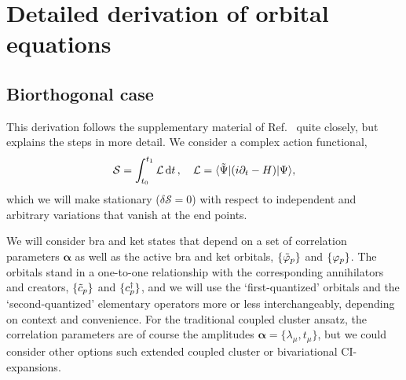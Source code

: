 \documentclass[aip,jcp,preprint,superscriptaddress,nofootinbib]{revtex4-1}
\begin{document}
\section{Detailed derivation of orbital equations}
\subsection{Biorthogonal case}
This derivation follows the supplementary material of Ref.~
quite closely, but explains the steps in more detail. We consider a complex
action functional,
\begin{align}
    \mathcal{S} = \int_{t_0}^{t_1} \mathcal{L} \dd{t}, \quad \mathcal{L} = \langle \tilde{\Psi} \vert (i \partial_t - H) \vert \Psi \rangle,
\end{align}
which we will make stationary ($\delta \mathcal{S} = 0$) with respect to independent
and arbitrary variations that vanish at the end points. 

We will consider bra and ket states that depend on a set of correlation
parameters $\bm{\alpha}$ as well as the active bra and ket orbitals,
$\{ \tilde{\varphi}_{p} \}$ and $\{ \varphi_{p} \}$. The orbitals stand in 
a one-to-one relationship with the corresponding annihilators
and creators, $\{ \tilde{c}_{p} \}$ and $\{ c^{\dagger}_{p} \}$, and
we will use the `first-quantized' orbitals and the `second-quantized'
elementary operators more or less interchangeably, depending on
context and convenience.
For the traditional coupled cluster
ansatz, the correlation parameters are of course the amplitudes
$\bm{\alpha} = \{ \lambda_\mu, t_\mu \}$, but we could consider
other options such extended coupled cluster or bivariational CI-expansions.
\end{document}
